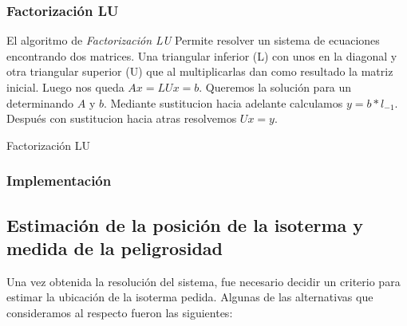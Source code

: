       \subsubsection*{Factorización LU}

        El algoritmo de \emph{Factorización LU} Permite resolver un sistema de ecuaciones encontrando dos matrices. Una triangular inferior (L) con unos en la diagonal y otra triangular superior (U) que al multiplicarlas dan como resultado la matriz inicial. Luego nos queda $A x = L U x = b$.
        Queremos la solución para un determinando $A$ y $b$. Mediante sustitucion hacia adelante calculamos $y = b * l_{-1}$. Después con sustitucion hacia atras resolvemos  $Ux = y$.

        \begin{algorithm}[H]
          \caption{Factorización LU}
        \end{algorithm}

    \subsubsection{Implementación}

  \subsection{Estimación de la posición de la isoterma y medida de la peligrosidad}

    Una vez obtenida la resolución del sistema, fue necesario decidir un criterio para estimar la ubicación de la isoterma pedida. Algunas de las alternativas que consideramos al respecto fueron las siguientes:

